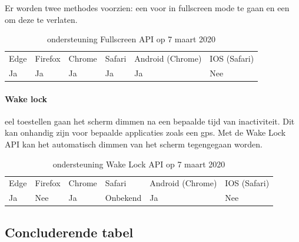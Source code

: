 Er worden twee methodes voorzien: een voor in fullscreen mode te gaan en een om deze te verlaten.

\begin{table}[H]
	\begin{tabular}{llllll}
		Edge & Firefox & Chrome & Safari & Android (Chrome) & IOS (Safari) \\
		Ja   & Ja      &  Ja   & Ja     & Ja               & Nee          
	\end{tabular}	
	\caption{ondersteuning  Fullscreen API op 7 maart 2020 }
\end{table}


\paragraph{Wake lock }
eel toestellen gaan het scherm dimmen na een bepaalde tijd van inactiviteit. Dit kan onhandig zijn voor bepaalde applicaties zoals een gps. Met de Wake Lock API \autocite{Bogdanovich2017} kan het automatisch dimmen van het scherm tegengegaan worden.

\begin{table}[H]
	\centering
	\begin{tabular}{llllll}
		Edge & Firefox & Chrome & Safari & Android (Chrome) & IOS (Safari) \\
		Ja   & Nee      &  Ja   & Onbekend     & Ja               & Nee          
	\end{tabular}	
	\caption{ondersteuning  Wake Lock API op 7 maart 2020 }
\end{table}

\subsection{Concluderende tabel}

